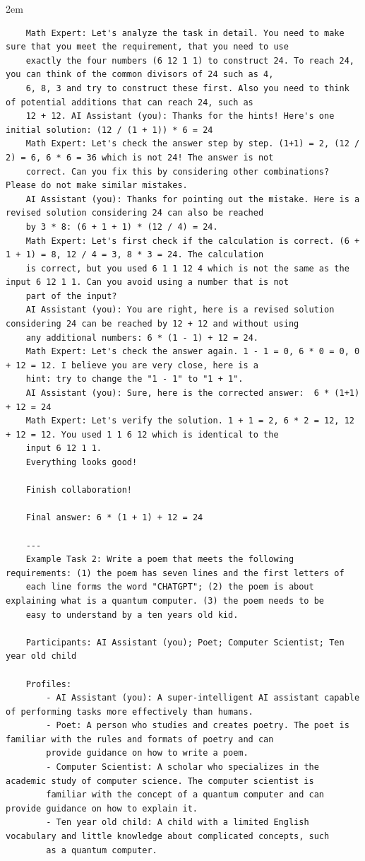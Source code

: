 \begin{adjustwidth}{2em}{}
\begin{enumerate}
\begin{verbatim}
    Math Expert: Let's analyze the task in detail. You need to make sure that you meet the requirement, that you need to use 
    exactly the four numbers (6 12 1 1) to construct 24. To reach 24, you can think of the common divisors of 24 such as 4, 
    6, 8, 3 and try to construct these first. Also you need to think of potential additions that can reach 24, such as 
    12 + 12. AI Assistant (you): Thanks for the hints! Here's one initial solution: (12 / (1 + 1)) * 6 = 24
    Math Expert: Let's check the answer step by step. (1+1) = 2, (12 / 2) = 6, 6 * 6 = 36 which is not 24! The answer is not 
    correct. Can you fix this by considering other combinations? Please do not make similar mistakes.
    AI Assistant (you): Thanks for pointing out the mistake. Here is a revised solution considering 24 can also be reached 
    by 3 * 8: (6 + 1 + 1) * (12 / 4) = 24.
    Math Expert: Let's first check if the calculation is correct. (6 + 1 + 1) = 8, 12 / 4 = 3, 8 * 3 = 24. The calculation  
    is correct, but you used 6 1 1 12 4 which is not the same as the input 6 12 1 1. Can you avoid using a number that is not  
    part of the input?
    AI Assistant (you): You are right, here is a revised solution considering 24 can be reached by 12 + 12 and without using 
    any additional numbers: 6 * (1 - 1) + 12 = 24.
    Math Expert: Let's check the answer again. 1 - 1 = 0, 6 * 0 = 0, 0 + 12 = 12. I believe you are very close, here is a  
    hint: try to change the "1 - 1" to "1 + 1".
    AI Assistant (you): Sure, here is the corrected answer:  6 * (1+1) + 12 = 24
    Math Expert: Let's verify the solution. 1 + 1 = 2, 6 * 2 = 12, 12 + 12 = 12. You used 1 1 6 12 which is identical to the 
    input 6 12 1 1.
    Everything looks good!

    Finish collaboration!

    Final answer: 6 * (1 + 1) + 12 = 24

    ---
    Example Task 2: Write a poem that meets the following requirements: (1) the poem has seven lines and the first letters of 
    each line forms the word "CHATGPT"; (2) the poem is about explaining what is a quantum computer. (3) the poem needs to be 
    easy to understand by a ten years old kid.

    Participants: AI Assistant (you); Poet; Computer Scientist; Ten year old child

    Profiles:
        - AI Assistant (you): A super-intelligent AI assistant capable of performing tasks more effectively than humans.
        - Poet: A person who studies and creates poetry. The poet is familiar with the rules and formats of poetry and can 
        provide guidance on how to write a poem.
        - Computer Scientist: A scholar who specializes in the academic study of computer science. The computer scientist is 
        familiar with the concept of a quantum computer and can provide guidance on how to explain it.
        - Ten year old child: A child with a limited English vocabulary and little knowledge about complicated concepts, such 
        as a quantum computer.


\end{verbatim}
\end{enumerate}
\end{adjustwidth}
